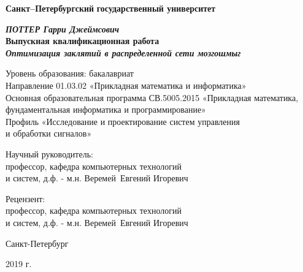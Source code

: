 
\begin{titlepage}
\begin{center}
\textbf{Санкт--Петербургский}
\textbf{государственный университет}

\vspace{35mm}

\textbf{\textit{\large ПОТТЕР Гарри Джеймсович}} \\[8mm]
\textbf{\large Выпускная квалификационная работа}\\[3mm]
\textbf{\textit{\large Оптимизация заклятий в распределенной сети
мозгошмыг}}

\vspace{20mm}
Уровень образования: бакалавриат\\
Направление 01.03.02 «Прикладная математика и информатика»\\
Основная образовательная программа СВ.5005.2015
«Прикладная математика, фундаментальная информатика и программирование»\\
Профиль «Исследование и проектирование систем управления\\ и обработки сигналов»\\[30mm]


\begin{flushright}
{Научный руководитель:} \\
профессор, кафедра компьютерных технологий \\ и систем, д.ф. - м.н.  Веремей~Евгений Игоревич
\end{flushright}
\begin{flushright}
{Рецензент:} \\
профессор, кафедра компьютерных технологий \\и систем, д.ф. - м.н.  Веремей~Евгений Игоревич
\end{flushright}

\vfill 

{Санкт-Петербург}
\par{2019 г.}
\end{center}
\end{titlepage}
\restoregeometry
\addtocounter{page}{1}